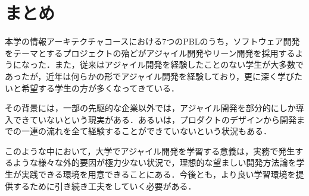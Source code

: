 \documentclass[fontsize=9pt, jafontscale=.95, twocolumn, a4paper]{jlreq}
\begin{document}
\section{まとめ}
\label{sec:org8b3740d}
本学の情報アーキテクチャコースにおける7つのPBLのうち，ソフトウェア開発をテーマとするプロジェクトの殆どがアジャイル開発やリーン開発を採用するようになった．また，従来はアジャイル開発を経験したことのない学生が大多数であったが，近年は何らかの形でアジャイル開発を経験しており，更に深く学びたいと希望する学生の方が多くなってきている．

その背景には，一部の先駆的な企業以外では，アジャイル開発を部分的にしか導入できていないという現実がある．あるいは，プロダクトのデザインから開発までの一連の流れを全て経験することができていないという状況もある．

このような中において，大学でアジャイル開発を学習する意義は，実務で発生するような様々な外的要因が極力少ない状況で，理想的な望ましい開発方法論を学生が実践できる環境を用意できることにある．今後とも，より良い学習環境を提供するために引き続き工夫をしていく必要がある．

% 
\printbibliography
\end{document}
